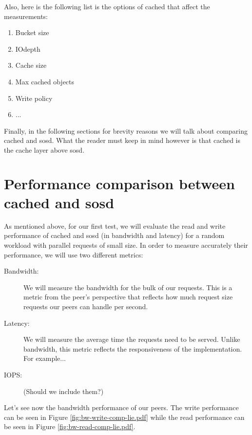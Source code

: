 Also, here is the following list is the options of cached that affect the 
measurements: 

\begin{enumerate}
	\item Bucket size
	\item IOdepth
	\item Cache size
	\item Max cached objects
	\item Write policy
	\item ...
\end{enumerate}

Finally, in the following sections for brevity reasons we will talk about 
comparing cached and sosd. What the reader must keep in mind however is that 
cached is the cache layer above sosd. 

\section{Performance comparison between cached and sosd}

As mentioned above, for our first test, we will evaluate the read and write 
performance of cached and sosd (in bandwidth and latency) for a random workload 
with parallel requests of small size. In order to measure accurately their 
performance, we will use two different metrics:

\begin{description}
	\item[Bandwidth:] We will measure the bandwidth for the bulk of our 
		requests. This is a metric from the peer's perspective that reflects 
		how much request size requests our peers can handle per second.
	\item[Latency:] We will measure the average time the requests need to be 
		served. Unlike bandwidth, this metric reflects the responsiveness of 
		the implementation. For example...
	\item[IOPS:] (Should we include them?)
\end{description}

Let's see now the bandwidth performance of our peers. The write performance can 
be seen in Figure \ref{fig:bw-write-comp-lie.pdf} while the read performance 
can be seen in Figure \ref{fig:bw-read-comp-lie.pdf}.


